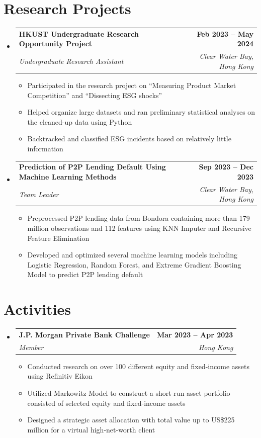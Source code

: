 \documentclass[letterpaper,11pt]{article}
\makeatletter
\newcommand{\resumeItem}[1]{
  \item\small{
    {#1 \vspace{-2pt}}
  }
}
\newcommand{\resumeSubheading}[4]{
  \vspace{-2pt}\item
    \begin{tabular*}{1.0\textwidth}[t]{l@{\extracolsep{\fill}}r}
      \textbf{#1} & \textbf{\small #2} \\
      \textit{\small#3} & \textit{\small #4} \\
    \end{tabular*}\vspace{-7pt}
}
\newcommand{\resumeSubHeadingListStart}{\begin{itemize}[leftmargin=0.0in, label={}]}
\newcommand{\resumeSubHeadingListEnd}{\end{itemize}}
\newcommand{\resumeItemListStart}{\begin{itemize}}
\newcommand{\resumeItemListEnd}{\end{itemize}\vspace{-5pt}}
\makeatother
\begin{document}
\section{Research Projects}
    \resumeSubHeadingListStart
        \resumeSubheading
            {HKUST Undergraduate Research Opportunity Project}{Feb 2023 -- May 2024}
            {Undergraduate Research Assistant}{Clear Water Bay, Hong Kong}
            \resumeItemListStart
                \resumeItem{Participated in the research project on ``Measuring Product Market Competition'' and ``Dissecting ESG shocks''}
                \resumeItem{Helped organize large datasets and ran preliminary statistical analyses on the cleaned-up data using Python}\
                \resumeItem{Backtracked and classified ESG incidents based on relatively little information}
            \resumeItemListEnd
        \resumeSubheading
            {Prediction of P2P Lending Default Using Machine Learning Methods}{Sep 2023 -- Dec 2023}
            {Team Leader}{Clear Water Bay, Hong Kong}
            \resumeItemListStart
                \resumeItem{Preprocessed P2P lending data from Bondora containing more than 179 million observations and 112 features using KNN Imputer and Recursive Feature Elimination}
                \resumeItem{Developed and optimized several machine learning models including Logistic Regression, Random Forest, and Extreme Gradient Boosting Model to predict P2P lending default}
            \resumeItemListEnd
    \resumeSubHeadingListEnd
\vspace{-16pt}


\section{Activities}
    \resumeSubHeadingListStart
        \resumeSubheading{J.P. Morgan Private Bank Challenge}{Mar 2023 -- Apr 2023}{Member}{Hong Kong}
            \resumeItemListStart
                \resumeItem{Conducted research on over 100 different equity and fixed-income assets using Refinitiv Eikon}
                \resumeItem{Utilized Markowitz Model to construct a short-run asset portfolio consisted of selected equity and fixed-income assets}
                \resumeItem{Designed a strategic asset allocation with total value up to US\$225 million for a virtual high-net-worth client}
            \resumeItemListEnd
        
    \resumeSubHeadingListEnd

 \vspace{-16pt}
\end{document}
